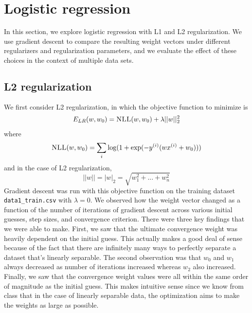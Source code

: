 \documentclass{article}
\begin{document}

\section{Logistic regression}
In this section, we explore logistic regression with L1 and L2 regularization. We use gradient descent to compare the resulting weight vectors under different regularizers and regularization parameters, and we evaluate the effect of these choices in the context of multiple data sets.

\subsection{L2 regularization}
We first consider L2 regularization, in which the objective function to minimize is
$$E_{LR}(w, w_0) = \textsc{NLL}(w, w_0) + \lambda ||w||^2_2$$
where
$$\textsc{NLL}(w, w_0) = \sum_i \log(1 + \exp(-y^{(i)} (w x^{(i)} + w_0)))$$
and in the case of L2 regularization,
$$||w|| = |w|_2 = \sqrt{w_1^2 + ... + w_n^2}$$
Gradient descent was run with this objective function on the training dataset \texttt{data1\_train.csv} with $\lambda = 0$. We observed how the weight vector changed as a function of the number of iterations of gradient descent across various initial guesses, step sizes, and convergence criterion. There were three key findings that we were able to make. First, we saw that the ultimate convergence weight was heavily dependent on the initial guess. This actually makes a good deal of sense because of the fact that there are infinitely many ways to perfectly separate a dataset that's linearly separable. The second observation was that $w_{0}$ and $w_{1}$ always decreased as number of iterations increased whereas $w_{2}$ also increased. Finally, we saw that the convergence weight values were all within the same order of magnitude as the initial guess. This makes intuitive sense since we know from class that in the case of linearly separable data, the optimization aims to make the weights as large as possible.
\end{document}
